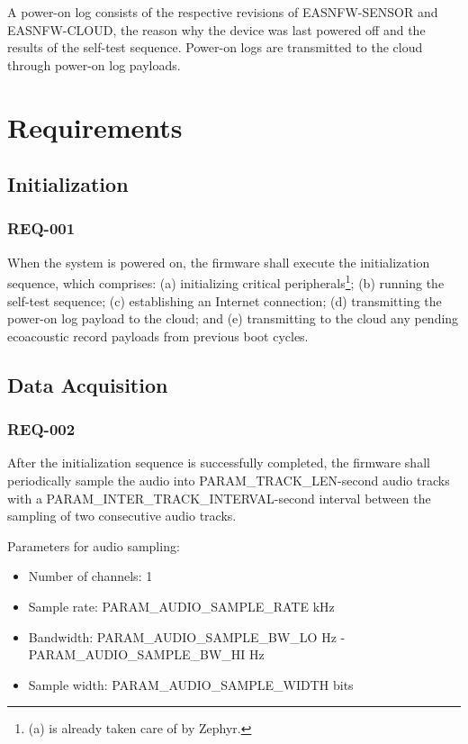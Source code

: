 \documentclass[11pt,a4paper]{article}
\begin{document}
A power-on log consists of the respective revisions of EASNFW-SENSOR and
EASNFW-CLOUD, the reason why the device was last powered off and the results of
the self-test sequence. Power-on logs are transmitted to the cloud through
power-on log payloads.

\section{Requirements}

\subsection{Initialization}

\subsubsection{REQ-001}

When the system is powered on, the firmware shall execute the initialization
sequence, which comprises: (a) initializing critical peripherals\footnote{(a) is
already taken care of by Zephyr.}; (b) running the self-test sequence; (c)
establishing an Internet connection; (d) transmitting the power-on log payload
to the cloud; and (e) transmitting to the cloud any pending ecoacoustic record
payloads from previous boot cycles.

\subsection{Data Acquisition}

\subsubsection{REQ-002}

After the initialization sequence is successfully completed, the firmware shall
periodically sample the audio into PARAM\_TRACK\_LEN-second audio tracks with a
PARAM\_INTER\_TRACK\_INTERVAL-second interval between the sampling of two
consecutive audio tracks.

Parameters for audio sampling:

\begin{itemize}
    \item Number of channels: 1
    \item Sample rate: PARAM\_AUDIO\_SAMPLE\_RATE kHz
    \item Bandwidth: PARAM\_AUDIO\_SAMPLE\_BW\_LO Hz -
          PARAM\_AUDIO\_SAMPLE\_BW\_HI Hz
    \item Sample width: PARAM\_AUDIO\_SAMPLE\_WIDTH bits
\end{itemize}
\end{document}
